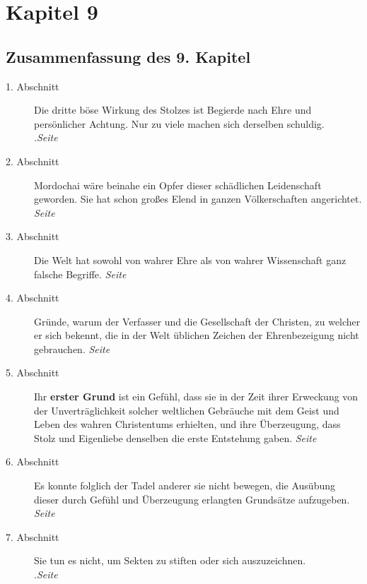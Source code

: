 
\chapter{Kapitel 9} \label{kap9}


\section{Zusammenfassung des 9. Kapitel}

\begin{description}
\item[1. Abschnitt] Die dritte böse Wirkung des Stolzes ist Begierde nach Ehre
und persönlicher Achtung. Nur zu viele machen sich derselben schuldig.\\
.\dotfill \textit{Seite~\pageref{kap9_ab1}}\\
\item[2. Abschnitt] Mordochai wäre beinahe ein Opfer dieser schädlichen
Leidenschaft geworden. Sie hat schon großes Elend in ganzen Völkerschaften
angerichtet.
\dotfill \textit{Seite~\pageref{kap9_ab2}}\\
\item[3. Abschnitt] Die Welt hat sowohl von wahrer Ehre als von wahrer
Wissenschaft ganz falsche Begriffe.
\dotfill \textit{Seite~\pageref{kap9_ab3}}\\
\item[4. Abschnitt] Gründe, warum der Verfasser und die Gesellschaft der
Christen, zu welcher er sich bekennt, die in der Welt üblichen Zeichen der
Ehrenbezeigung nicht gebrauchen.
\dotfill \textit{Seite~\pageref{kap9_ab4}}\\
\item[5. Abschnitt] Ihr \textbf{erster Grund} ist ein Gefühl, dass sie in der
Zeit ihrer
Erweckung von der Unverträglichkeit solcher weltlichen Gebräuche mit dem Geist
und Leben des wahren Christentums erhielten, und ihre Überzeugung, dass Stolz
und Eigenliebe denselben die erste Entstehung gaben.
\dotfill \textit{Seite~\pageref{kap9_ab5}}\\
\item[6. Abschnitt] Es konnte folglich der Tadel anderer sie nicht bewegen, die
Ausübung dieser durch Gefühl und Überzeugung erlangten Grundsätze aufzugeben.
\dotfill \textit{Seite~\pageref{kap9_ab6}}\\
\item[7. Abschnitt] Sie tun es nicht, um Sekten zu stiften oder sich
auszuzeichnen.\\
.\dotfill \textit{Seite~\pageref{kap9_ab7}}\\

\end{description}

